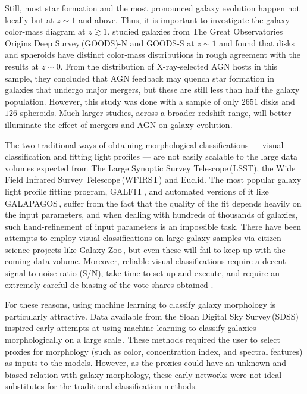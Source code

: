 \documentclass[twocolumn]{aastex63}
\begin{document}
Still, most star formation and the most pronounced galaxy evolution happen not locally but at $z\sim1$ and above. Thus, it is important to investigate the galaxy color-mass diagram at $z\gtrsim1$. \citet{powell_17} studied galaxies from The Great Observatories Origins Deep Survey\,(GOODS)-N and GOODS-S at $z\sim1$ and found that disks and spheroids have distinct color-mass distributions in rough agreement with the results at $z\sim0$. From the distribution of X-ray-selected AGN hosts in this sample, they concluded that AGN feedback may quench star formation in galaxies that undergo major mergers, but these are still less than half the galaxy population. However, this study was done with a sample of only $2651$ disks and $126$ spheroids. Much larger studies, across a broader redshift range, will better illuminate the effect of mergers and AGN on galaxy evolution. 

The two traditional ways of obtaining morphological classifications --- visual classification and fitting light profiles --- are not easily scalable to the large data volumes expected from The Large Synoptic Survey Telescope\,(LSST), the Wide Field Infrared Survey Telescope\,(WFIRST) and Euclid. The most popular galaxy light profile fitting program, GALFIT\,\citep{galfit}, and automated versions of it like GALAPAGOS\,\citep{galapagos}, suffer from the fact that the quality of the fit depends heavily on the input parameters, and when dealing with hundreds of thousands of galaxies, such hand-refinement of input parameters is an impossible task. There have been attempts to employ visual classifications on large galaxy samples via citizen science projects like Galaxy Zoo\,\citep{gzoo_p1,gzoo_p2}, but even these will fail to keep up with the coming data volume. Moreover, reliable visual classifications require a decent signal-to-noise ratio (S/N), take time to set up and execute, and require an extremely careful de-biasing of the vote shares obtained \citep{gzoo_p1,gzoo_candels}. 

For these reasons, using machine learning to classify galaxy morphology is particularly attractive. Data available from the Sloan Digital Sky Survey\,(SDSS) inspired early attempts at using machine learning to classify galaxies morphologically on a large scale\,\citep[e.g.,][]{Ball2004GalaxyNetworks,Kelly2004MorphologicalSurvey,banerji_10}. These methods required the user to select proxies for morphology (such as color, concentration index, and spectral features) as inputs to the models. However, as the proxies could have an unknown and biased relation with galaxy morphology, these early networks were not ideal substitutes for the traditional classification methods. 
\end{document}
